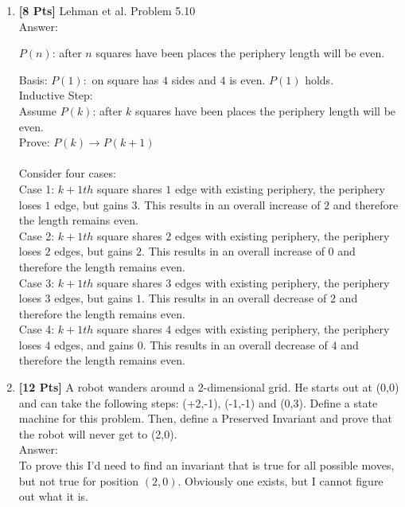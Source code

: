 \begin{enumerate}
\clearpage

\item {\bf [8 Pts]} Lehman et al. Problem 5.10\\
Answer:

$P(n)$: after $n$ squares have been places the periphery length will be even.

Basis: $P(1):$ on square has $4$ sides and $4$ is even. $P(1)$ holds.\\

Inductive Step:\\
Assume $P(k)$: after $k$ squares have been places the periphery length will be even.\\
Prove: $P(k) \rightarrow P(k+1)$\\\\
Consider four cases:\\
Case 1: $k+1th$ square shares $1$ edge with existing periphery, the periphery loses $1$ edge, but gains $3$. This results in an overall increase of $2$ and therefore the length remains even.\\
Case 2: $k+1th$ square shares $2$ edges with existing periphery, the periphery loses $2$ edges, but gains $2$. This results in an overall increase of $0$ and therefore the length remains even.\\
Case 3: $k+1th$ square shares $3$ edges with existing periphery, the periphery loses $3$ edges, but gains $1$. This results in an overall decrease of $2$ and therefore the length remains even.\\
Case 4: $k+1th$ square shares $4$ edges with existing periphery, the periphery loses $4$ edges, and gains $0$. This results in an overall decrease of $4$ and therefore the length remains even.\\

\item {\bf [12 Pts]} A robot wanders around a 2-dimensional grid. He starts out at (0,0) and can take the following steps: (+2,-1), (-1,-1) and (0,3).
Define a state machine for this problem. Then, define a Preserved Invariant and prove that the robot will never get to (2,0).\\

Answer:\\

To prove this I'd need to find an invariant that is true for all possible moves, but not true for position $(2,0)$. Obviously one exists, but I cannot figure out what it is.

\end{enumerate}

